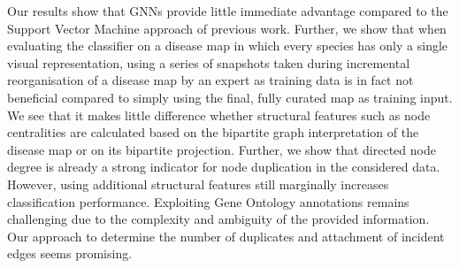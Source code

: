 \documentclass[
	fontsize=10pt, %
	twoside=false, %
	secnumdepth=1, %
  toc=indentunnumbered %
]{kaobook}
\begin{document}
Our results show that GNNs provide little immediate advantage compared to the
Support Vector Machine approach of previous work. 
%
Further, we show that when evaluating the classifier on a disease map in which
every species has only a single visual representation, using a series of
snapshots taken during incremental reorganisation of a disease map by an expert
as training data is in fact not beneficial compared to simply using the final,
fully curated map as training input.
%
We see that it makes little difference whether structural features such as node
centralities are calculated based on the bipartite graph interpretation of the
disease map or on its bipartite projection.
%
Further, we show that directed node degree is already a strong indicator for
node duplication in the considered data. However, using additional structural
features still marginally increases classification performance.
%
Exploiting Gene Ontology annotations remains challenging due to the complexity
and ambiguity of the provided information.
%
Our approach to determine the number of duplicates and attachment of incident
edges seems promising.





\end{document}

